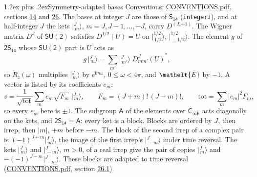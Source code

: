 \documentclass[10pt,a4paper]{article}
\makeatletter
\renewcommand\section{\@startsection{section}{1}{\z@}{-3ex plus -1ex minus -.2ex}%
  {1.2ex plus .2ex}{\normalfont\large\sffamily\bfseries\color{parttitle}}}
\numberwithin{equation}{section}
\newcommand{\eltfont}[1]{{\let\sigma\eltsigma\mathelt{#1}}}
\newcommand{\grp}[1]{\mathsf{#1}}
\newcommand{\elt}[1]{\eltfont{#1}}
\newcommand{\iunit}{\mathrm{i}}
\newcommand{\expe}{\mathrm{e}}
\newcommand{\irrJp}[2]{D^{(#1,#2)}}
\newcommand{\wignerD}[1]{D^{#1}}
\newcommand{\conj}[1]{{#1}^{*}}
\newcommand{\jm}[2]{\bigl\lvert{}^{#1}_{\,#2}\bigr\rangle}
\newcommand{\barred}[1]{\bar{#1}}
\newcommand{\lift}[1]{\tilde{#1}}
\makeatother
\begin{document}
\section{Symmetry-adapted bases}\label{s:bases}
Conventions: \href{../../CONVENTIONS.pdf}{CONVENTIONS.pdf}, sections \href{../../../rotation/CONVENTIONS.pdf\#conv.14}{14} and \href{../../CONVENTIONS.pdf\#conv.26}{26}.
\leavevmode\label{n:index.m}\label{n:vector.ket}The bases at integer $J$ are those of \href{../../../rotation/data/pdf/S14.pdf}{$\grp{S_{14}}$} (\texttt{integerJ}), and at half-integer $J$ the kets $\jm{J}{m}$, $m = J, J-1, \dots, -J$, carry $\irrJp{J}{+1}$. \label{n:matrix.wigner}The Wigner matrix $\wignerD{J}$ of $\grp{SU(2)}$ satisfies $\wignerD{1/2}(U) = U$ on $\jm{1/2}{1/2}$, $\jm{1/2}{-1/2}$. The element $g$ of $\grp{2S_{14}}$ whose $\grp{SU(2)}$ part is $U$ acts as
\begin{equation}\label{e:action}g\,\jm{J}{m} = \sum_{m'} \jm{J}{m'}\; \conj{\wignerD{J}_{m m'}(U)},\end{equation}
so $\lift{R}_{z}(\omega)$ multiplies $\jm{J}{m}$ by $\expe^{\iunit m\omega}$, $0 \le \omega < 4\pi$, and $\elt{\barred{E}}$ by $-1$. \label{n:index.ketcoefficient}\label{n:vector.basis.symmetry}\label{n:index.ketweight}\label{n:index.total}A vector is listed by its coefficients $e_m$:
\begin{equation}\label{e:ket}v = \frac{1}{\sqrt{\mathrm{tot}}}\sum_m e_m\sqrt{F_m}\;\jm{J}{m},\qquad F_m = (J+m)!\,(J-m)!,\qquad \mathrm{tot} = \sum_m |e_m|^2F_m,\end{equation}
so every $e_m$ here is $\pm 1$.
\leavevmode\label{n:group.A}The subgroup $\grp{A}$ of the elements over $\grp{C_{\infty h}}$ acts diagonally on the kets, and $\grp{2S_{14}} = \grp{A}$: every ket is a block. Blocks are ordered by $J$, then irrep, then $|m|$, $+m$ before $-m$. The block of the second irrep of a complex pair is $(-1)^{J+m}\jm{J}{m}$, the image of the first irrep's $\jm{J}{-m}$ under time reversal. The kets $\jm{J}{m}$ and $\jm{J}{-m}$, $m > 0$, of a real irrep give the pair of copies $\jm{J}{m}$ and $-(-1)^{J-m}\jm{J}{-m}$. These blocks are adapted to time reversal (\href{../../CONVENTIONS.pdf}{CONVENTIONS.pdf}, section \href{../../CONVENTIONS.pdf\#conv.26.1}{26.1}).
\end{document}
